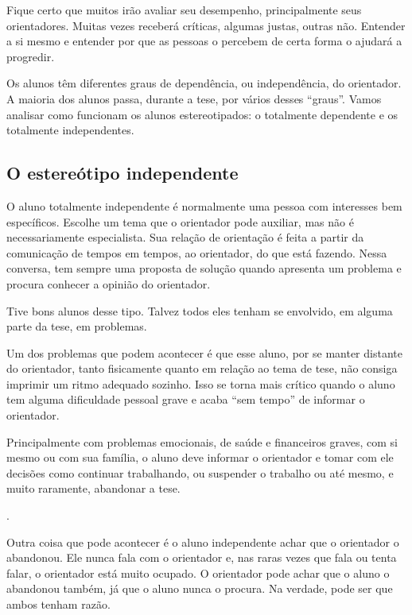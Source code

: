 Fique certo que muitos irão avaliar seu desempenho, principalmente seus orientadores. 
 Muitas vezes receberá críticas, algumas justas, outras não. 
 Entender a si mesmo e entender por que as pessoas o percebem de certa forma o ajudará a progredir.


Os alunos têm diferentes graus de dependência, ou independência, do orientador. A maioria dos alunos passa, durante a tese, por vários desses “graus”. Vamos analisar como funcionam os alunos estereotipados: o totalmente dependente e os totalmente independentes.


\subsection{O estereótipo independente}


O aluno totalmente independente é normalmente uma pessoa com interesses bem específicos. Escolhe um tema que o orientador pode auxiliar, mas não é necessariamente especialista. Sua relação de orientação é feita a partir da comunicação de tempos em tempos, ao orientador, do que está fazendo. Nessa conversa, tem sempre uma proposta de solução quando apresenta um problema e procura conhecer a opinião do orientador. 


Tive bons alunos desse tipo. Talvez todos eles tenham se envolvido, em alguma parte da tese, em problemas.


Um dos problemas que podem acontecer é que esse aluno, por se manter distante do orientador, tanto fisicamente quanto em relação ao tema de tese, não consiga imprimir um ritmo adequado sozinho. Isso se torna mais crítico quando o aluno tem alguma dificuldade pessoal grave e acaba “sem tempo” de informar o orientador.



Principalmente com problemas emocionais, de saúde e financeiros graves, com si mesmo ou com sua família, o aluno deve informar o orientador e tomar com ele decisões como continuar trabalhando, ou suspender o trabalho ou até mesmo, e muito raramente, abandonar a tese. 

.


Outra coisa que pode acontecer é o aluno independente achar que o orientador o abandonou. Ele nunca fala com o orientador e, nas raras vezes que fala ou tenta falar, o orientador está muito ocupado. O orientador pode achar que o aluno o abandonou também, já que o aluno nunca o procura. Na verdade, pode ser que ambos tenham razão. 



